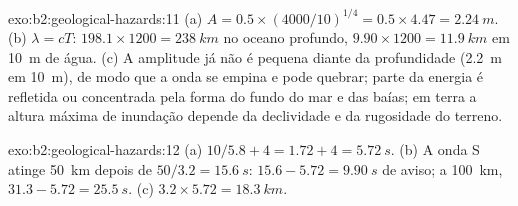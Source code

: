 \begin{solution}{exo:b2:geological-hazards:11}
(a) $A = 0.5 \times (4000/10)^{1/4} = 0.5 \times 4.47 = \qty{2.24}{m}$. (b) $\lambda = cT$:
$198.1 \times 1200 = \qty{238}{km}$ no oceano profundo, $9.90 \times 1200 = \qty{11.9}{km}$ em
\qty{10}{m} de água. (c) A amplitude já não é pequena diante da profundidade (\qty{2.2}{m} em
\qty{10}{m}), de modo que a onda se empina e pode quebrar; parte da energia é refletida ou concentrada pela
forma do fundo do mar e das baías; em terra a altura máxima de inundação depende da declividade e da rugosidade do
terreno.
\end{solution}

\begin{solution}{exo:b2:geological-hazards:12}
(a) $10/5.8 + 4 = 1.72 + 4 = \qty{5.72}{s}$. (b) A onda S atinge \qty{50}{km} depois de $50/3.2 =
\qty{15.6}{s}$: $15.6 - 5.72 = \qty{9.90}{s}$ de aviso; a \qty{100}{km}, $31.3 - 5.72 =
\qty{25.5}{s}$. (c) $3.2 \times 5.72 = \qty{18.3}{km}$.
\end{solution}

